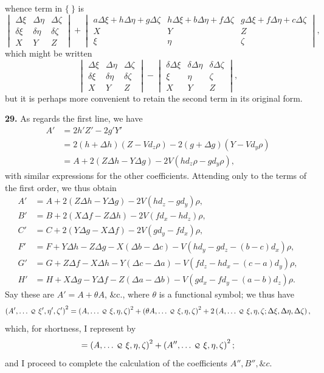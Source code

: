 \documentclass[11pt,a4paper]{article}
\newcommand{\cayq}{\mathbin{\raisebox{0.08ex}{\(\scriptstyle\mathcal Q\)}}}
\newcommand{\qf}[2]{\left(#1\,\cayq\,#2\right)^2}
\newcommand{\ql}[2]{\left(#1\,\cayq\,#2\right)}
\newcommand{\Dx}{d_x}
\newcommand{\Dy}{d_y}
\newcommand{\Dz}{d_z}
\newcommand{\V}{V}
\begin{document}
\newpage
whence term in \(\{\ \}\) is
\[
\begin{vmatrix}
\Delta\xi&\Delta\eta&\Delta\zeta\\
\delta\xi&\delta\eta&\delta\zeta\\
X&Y&Z
\end{vmatrix}
+
\begin{vmatrix}
a\Delta\xi+h\Delta\eta+g\Delta\zeta&
h\Delta\xi+b\Delta\eta+f\Delta\zeta&
g\Delta\xi+f\Delta\eta+c\Delta\zeta\\
X&Y&Z\\
\xi&\eta&\zeta
\end{vmatrix},
\]
which might be written
\[
\begin{vmatrix}
\Delta\xi&\Delta\eta&\Delta\zeta\\
\delta\xi&\delta\eta&\delta\zeta\\
X&Y&Z
\end{vmatrix}
-
\begin{vmatrix}
\delta\Delta\xi&\delta\Delta\eta&\delta\Delta\zeta\\
\xi&\eta&\zeta\\
X&Y&Z
\end{vmatrix},
\]
but it is perhaps more convenient to retain the second term in its original form.

\textbf{29.} As regards the first line, we have
\begin{align*}
A'&=2h'Z'-2g'Y'\\
&=2(h+\Delta h)(Z-\V\Dz\rho)-2(g+\Delta g)(Y-\V\Dy\rho)\\
&=A+2(Z\Delta h-Y\Delta g)-2\V(h\Dz\rho-g\Dy\rho),
\end{align*}
with similar expressions for the other coefficients. Attending only to the terms of the first order, we thus obtain
\begin{align*}
A'&=A+2(Z\Delta h-Y\Delta g)-2\V(h\Dz-g\Dy)\rho,\\
B'&=B+2(X\Delta f-Z\Delta h)-2\V(f\Dx-h\Dz)\rho,\\
C'&=C+2(Y\Delta g-X\Delta f)-2\V(g\Dy-f\Dx)\rho,\\
F'&=F+Y\Delta h-Z\Delta g-X(\Delta b-\Delta c)
     -\V(h\Dy-g\Dz-(b-c)\Dx)\rho,\\
G'&=G+Z\Delta f-X\Delta h-Y(\Delta c-\Delta a)
     -\V(f\Dz-h\Dx-(c-a)\Dy)\rho,\\
H'&=H+X\Delta g-Y\Delta f-Z(\Delta a-\Delta b)
     -\V(g\Dx-f\Dy-(a-b)\Dz)\rho.
\end{align*}
Say these are \(A'=A+\theta A\), \&c., where \(\theta\) is a functional symbol; we thus have
\[
\qf{A',\ldots}{\xi',\eta',\zeta'}
=\qf{A,\ldots}{\xi,\eta,\zeta}
+\qf{\theta A,\ldots}{\xi,\eta,\zeta}
+2\ql{A,\ldots}{\xi,\eta,\zeta;\Delta\xi,\Delta\eta,\Delta\zeta},
\]
which, for shortness, I represent by
\[
=\qf{A,\ldots}{\xi,\eta,\zeta}+\qf{A'',\ldots}{\xi,\eta,\zeta};
\]
and I proceed to complete the calculation of the coefficients \(A'',B'',\&c.\)
\end{document}
